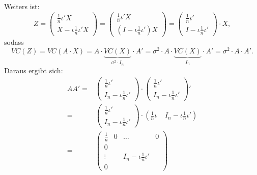\documentclass[10pt]{article}
\newenvironment{BSP}[1][]
{\begin{Beispiel}[frametitle=#1]}{\end{Beispiel}}
\begin{document}
\begin{BSP}[Beispiel 3.0.1 (komponentenweise Unkorreliertheit)]
				Weiters ist:
				\begin{equation*}
					Z = \left(
					\begin{array}{c}
						\frac{1}{n} \iota' X\\
						X - \iota \frac{1}{n} \iota' X
					\end{array}
					\right) = \left(
					\begin{array}{c}
						\frac{1}{n} \iota' X\\
						(I - \iota \frac{1}{n} \iota') X
					\end{array}
					\right) =  \left(
					\begin{array}{c}
						\frac{1}{n} \iota'\\
						I - \iota \frac{1}{n} \iota'
					\end{array}
					\right) \cdot X, 						
				\end{equation*}
				sodass
				\begin{equation*}
					VC(Z) = VC(A \cdot X) = A \cdot \underbrace{VC(X)}_{\sigma^2 \cdot I_n} \cdot A' = \sigma^2 \cdot A \cdot \underbrace{VC(X)}_{I_n} \cdot A' = \sigma^2 \cdot A \cdot A'.
				\end{equation*}
				Daraus ergibt sich:
				\begin{equation*}
					\begin{split}
						AA' =&  \left(
						\begin{array}{c}
							\frac{1}{n} \iota'\\
							I_n - \iota \frac{1}{n} \iota'
						\end{array}
						\right) \cdot  \left(
						\begin{array}{c}
							\frac{1}{n} \iota'\\
							I_n - \iota \frac{1}{n} \iota'
						\end{array}
						\right)'\\
						=&  \left(
						\begin{array}{c}
							\frac{1}{n} \iota'\\
							I_n - \iota \frac{1}{n} \iota'
						\end{array}
						\right) \cdot  \left( \frac{1}{n} \iota \; \; \; \; I_n - \iota \frac{1}{n} \iota'\right)\\
						=& \begin{pmatrix}
							\frac{1}{n} & 0 & \ldots &  0\\
							0 &  &  &\\
							\vdots &  & I_n - \iota \frac{1}{n} \iota' &\\
							0 & & & 

\end{pmatrix}
\end{split}
\end{equation*}
\end{BSP}
\end{document}
